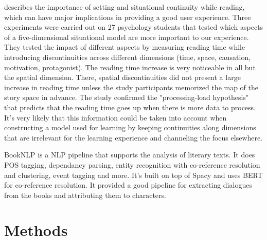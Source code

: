 \documentclass[fleqn,moreauthors,10pt]{ds_report}
\begin{document}
\cite{situation_models} describes the importance of setting and situational continuity while reading, which can have major implications in providing a good user experience.
Three experiments were carried out on 27 psychology students that tested which aspects of a five-dimensional situational model are more important to our experience.
They tested the impact of different aspects by measuring reading time while introducing discontinuities across different dimensions (time, space, causation, motivation, protagonist).
The reading time increase is very noticeable in all but the spatial dimension.
There, spatial discontinuities did not present a large increase in reading time unless the study participants memorized the map of the story space in advance.
The study confirmed the "processing-load hypothesis" that predicts that the reading time goes up when there is more data to process.
It's very likely that this information could be taken into account when constructing a model used for learning by keeping continuities along dimensions that are irrelevant for the learning experience and channeling the focus elsewhere.


BookNLP \cite{booknlp} is a NLP pipeline that supports the analysis of literary texts. It does POS tagging, dependancy parsing, entity recognition with co-reference resolution and clustering, event tagging and more. It's built on top of Spacy \cite{spacy2} and uses BERT \cite{joshi2019bert} for co-reference resolution. It provided a good pipeline for extracting dialogues from the books and attributing them to characters.


\section*{Methods}


\end{document}

